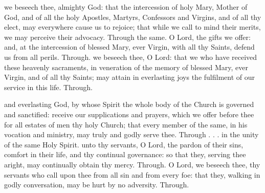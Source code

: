 \vspace{-1ex}
\begin{multicols}{2}
 we beseech thee, almighty God: that the intercession of holy Mary, Mother of God, and of all the holy Apostles, Martyrs, Confessors and Virgins, and of all thy elect, may everywhere cause us to rejoice; that while we call to mind their merits, we may perceive their advocacy. Through the same.
 O Lord, the gifts we offer: and, at the intercession of blessed Mary, ever Virgin, with all thy Saints, defend us from all perils. Through.
 we beseech thee, O Lord: that we who have received these heavenly sacraments, in veneration of the memory of blessed Mary, ever Virgin, and of all thy Saints; may attain in everlasting joys the fulfilment of our service in this life. Through.

%

 and everlasting God, by whose Spirit the whole body of the Church is governed and sanctified: receive our supplications and prayers, which we offer before thee for all estates of men thy holy Church; that every member of the same, in his vocation and ministry, may truly and godly serve thee. Through . . . in the unity of the same Holy Spirit.
 unto thy servants, O Lord, the pardon of their sins, comfort in their life, and thy continual governance: so that they, serving thee aright, may continually obtain thy mercy. Through.
\postcommunion
{} O Lord, we beseech thee, thy servants who call upon thee from all sin and from every foe: that they, walking in godly conversation, may be hurt by no adversity. Through.


\end{multicols}
